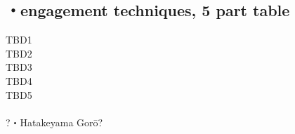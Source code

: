 \documentclass[dvipdfmx, a4paper, 12pt]{utarticle}
\begin{document}
\begin{CJK*}{UTF8}{min}
\begin{landscape}
\section{・engagement techniques, 5 part table}
\noindent TBD1\\
TBD2\\
TBD3\\
TBD4\\
TBD5\\
\\
?・Hatakeyama Gor\={o}?

\end{landscape}
\end{CJK*}
\end{document}
